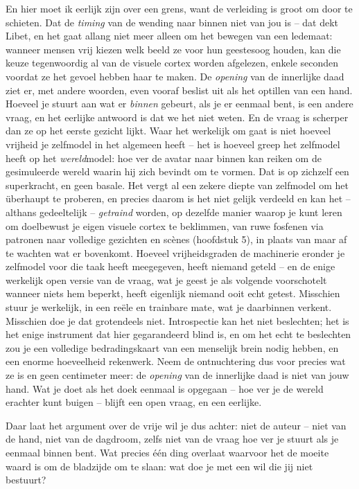 \documentclass[11pt, twoside, openright]{book}
\begin{document}
En hier moet ik eerlijk zijn over een grens, want de verleiding is groot om door te schieten. Dat de \textit{timing} van de wending naar binnen niet van jou is -- dat dekt Libet, en het gaat allang niet meer alleen om het bewegen van een ledemaat: wanneer mensen vrij kiezen welk beeld ze voor hun geestesoog houden, kan die keuze tegenwoordig al van de visuele cortex worden afgelezen, enkele seconden voordat ze het gevoel hebben haar te maken. De \textit{opening} van de innerlijke daad ziet er, met andere woorden, even vooraf beslist uit als het optillen van een hand. Hoeveel je stuurt aan wat er \textit{binnen} gebeurt, als je er eenmaal bent, is een andere vraag, en het eerlijke antwoord is dat we het niet weten. En de vraag is scherper dan ze op het eerste gezicht lijkt. Waar het werkelijk om gaat is niet hoeveel vrijheid je zelfmodel in het algemeen heeft -- het is hoeveel greep het zelfmodel heeft op het \textit{wereld}model: hoe ver de avatar naar binnen kan reiken om de gesimuleerde wereld waarin hij zich bevindt om te vormen. Dat is op zichzelf een superkracht, en geen basale. Het vergt al een zekere diepte van zelfmodel om het überhaupt te proberen, en precies daarom is het niet gelijk verdeeld en kan het -- althans gedeeltelijk -- \textit{getraind} worden, op dezelfde manier waarop je kunt leren om doelbewust je eigen visuele cortex te beklimmen, van ruwe fosfenen via patronen naar volledige gezichten en scènes (hoofdstuk 5), in plaats van maar af te wachten wat er bovenkomt. Hoeveel vrijheidsgraden de machinerie eronder je zelfmodel voor die taak heeft meegegeven, heeft niemand geteld -- en de enige werkelijk open versie van de vraag, wat je geest je als volgende voorschotelt wanneer niets hem beperkt, heeft eigenlijk niemand ooit echt getest. Misschien stuur je werkelijk, in een reële en trainbare mate, wat je daarbinnen verkent. Misschien doe je dat grotendeels niet. Introspectie kan het niet beslechten; het is het enige instrument dat hier gegarandeerd blind is, en om het echt te beslechten zou je een volledige bedradingskaart van een menselijk brein nodig hebben, en een enorme hoeveelheid rekenwerk. Neem de ontnuchtering dus voor precies wat ze is en geen centimeter meer: de \textit{opening} van de innerlijke daad is niet van jouw hand. Wat je doet als het doek eenmaal is opgegaan -- hoe ver je de wereld erachter kunt buigen -- blijft een open vraag, en een eerlijke.

Daar laat het argument over de vrije wil je dus achter: niet de auteur -- niet van de hand, niet van de dagdroom, zelfs niet van de vraag hoe ver je stuurt als je eenmaal binnen bent. Wat precies één ding overlaat waarvoor het de moeite waard is om de bladzijde om te slaan: wat doe je met een wil die jij niet bestuurt?
\end{document}
